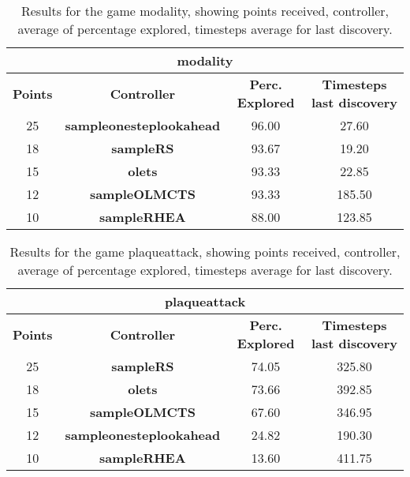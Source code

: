 \begin{table*}[!t]
\begin{center}
\begin{tabular}{|c|c|c|c|}
\multicolumn{4}{c}{\textbf{modality}}\\
\hline
\textbf{Points} & \textbf{Controller} & \textbf{Perc. Explored} &  \textbf{Timesteps last discovery}\\
\hline
25 & \textbf{sampleonesteplookahead} & 96.00 & 27.60
 \\
\hline
18 & \textbf{sampleRS} & 93.67 & 19.20
 \\
\hline
15 & \textbf{olets} & 93.33 & 22.85
 \\
\hline
12 & \textbf{sampleOLMCTS} & 93.33 & 185.50
 \\
\hline
10 & \textbf{sampleRHEA} & 88.00 & 123.85
 \\
\hline
\end{tabular}
\caption{Results for the game modality, showing points received, controller, average of percentage explored, timesteps average for last discovery.}
\label{tab:weights}
\end{center}
\end{table*}
\begin{table*}[!t]
\begin{center}
\begin{tabular}{|c|c|c|c|}
\multicolumn{4}{c}{\textbf{plaqueattack}}\\
\hline
\textbf{Points} & \textbf{Controller} & \textbf{Perc. Explored} &  \textbf{Timesteps last discovery}\\
\hline
25 & \textbf{sampleRS} & 74.05 & 325.80
 \\
\hline
18 & \textbf{olets} & 73.66 & 392.85
 \\
\hline
15 & \textbf{sampleOLMCTS} & 67.60 & 346.95
 \\
\hline
12 & \textbf{sampleonesteplookahead} & 24.82 & 190.30
 \\
\hline
10 & \textbf{sampleRHEA} & 13.60 & 411.75
 \\
\hline
\end{tabular}
\caption{Results for the game plaqueattack, showing points received, controller, average of percentage explored, timesteps average for last discovery.}
\label{tab:weights}
\end{center}
\end{table*}
